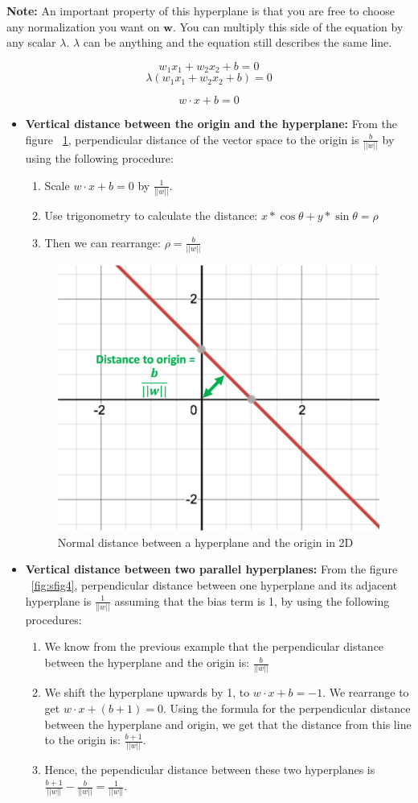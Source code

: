 \documentclass[11pt]{article}
\begin{document}
\textbf{Note:} An important property of this hyperplane is that you are free to choose any normalization you want on $\mathbf{w}$. You can multiply this side of the equation by any scalar $\lambda$. $\lambda$ can be anything and the equation still describes the same line.
 
$$w_1 x_1 + w_2 x_2 + b = 0$$
$$\lambda(w_1 x_1 + w_2 x_2 + b )= 0$$

$$w \cdot x + b = 0$$
\begin{itemize}
\item{
\textbf{Vertical distance between the origin and the hyperplane:} From the figure ~\ref{fig:sfig3}, perpendicular distance of the vector space to the origin is $\frac{b}{||w||}$ by using the following procedure:

\begin{enumerate}
    \item Scale $w \cdot x + b = 0$ by $\frac{1}{||w||}$.
    \item Use trigonometry to calculate the distance: $x*\cos{\theta} + y*\sin{\theta} = \rho$
    \item Then we can rearrange: $\rho = \frac{b}{||w||}$
    
\end{enumerate}

\begin{figure}[H]
  \centering
  \includegraphics[width=.4\linewidth]{images/distance.png}
  \caption{Normal distance between a hyperplane and the origin in 2D}
  \label{fig:sfig3}
\end{figure}
}

\item{
\textbf{Vertical distance between two parallel hyperplanes:} From the figure ~\ref{fig:sfig4}, perpendicular distance between one hyperplane and its adjacent hyperplane is $\frac{1}{||w||}$ assuming that the bias term is 1,  by using the following procedures:
\begin{enumerate}
    \item We know from the previous example that the perpendicular distance between the hyperplane and the origin is: $\frac{b}{||w||}$
    \item We shift the hyperplane upwards by 1, to $w \cdot x + b = -1$. We rearrange to get $w \cdot x + (b+1)= 0$. Using the formula for the perpendicular distance between the hyperplane and origin, we get that the distance from this line to the origin is: $\frac{b+1}{||w||}$.
    \item Hence, the pependicular distance between these two hyperplanes is $\frac{b+1}{||w||} - \frac{b}{||w||} = \frac{1}{||w||}$.
\end{enumerate}

}
\end{itemize}
\end{document}
